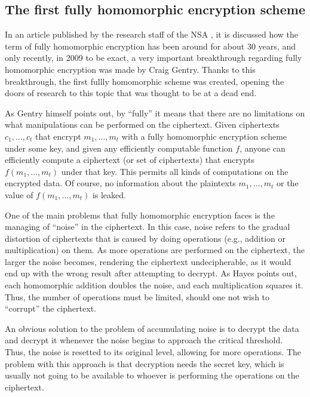 \subsection{The first fully homomorphic encryption scheme}

In an article published by the research staff of the NSA \cite{NSA2014}, it is discussed how the term of fully homomorphic encryption has been around for about 30 years, and only recently, in 2009 to be exact, a very important breakthrough regarding fully homomorphic encryption was made by Craig Gentry. Thanks to this breakthrough, the first fullly homomorphic scheme was created, opening the doors of research to this topic that was thought to be at a dead end. 

As Gentry \cite{homoenc} himself points out, by ``fully'' it means that there are no limitations on what manipulations can be performed on the ciphertext. Given ciphertexts $c_{1}, \dots, c_{t}$ that encrypt $m_{1}, \dots, m_{t}$ with a fully homomorphic encryption scheme under some key, and given any efficiently computable function $f$, anyone can efficiently compute a ciphertext (or set of ciphertexts) that encrypts $f(m_{1}, \dots, m_{t})$ under that key. This permits all kinds of computations on the encrypted data. Of course, no information about the plaintexts $m_{1}, \dots, m_{t}$ or the value of $f(m_{1}, \dots, m_{t})$ is leaked. 

One of the main problems that fully homomorphic encryption faces is the managing of ``noise'' in the ciphertext. In this case, noise refers to the gradual distortion of ciphertexts that is caused by doing operations (e.g., addition or multiplication) on them. As more operations are performed on the ciphertext, the larger the noise becomes, rendering the ciphertext undecipherable, as it would end up with the wrong result after attempting to decrypt. As Hayes \cite{Hayes2012} points out, each homomorphic addition doubles the noise, and each multiplication squares it. Thus, the number of operations must be limited, should one not wish to ``corrupt'' the ciphertext. 

An obvious solution to the problem of accumulating noise is to decrypt the data and decrypt it whenever the noise begins to approach the critical threshold. Thus, the noise is resetted to its original level, allowing for more operations. The problem with this approach is that decryption needs the secret key, which is usually not going to be available to whoever is performing the operations on the ciphertext. 

